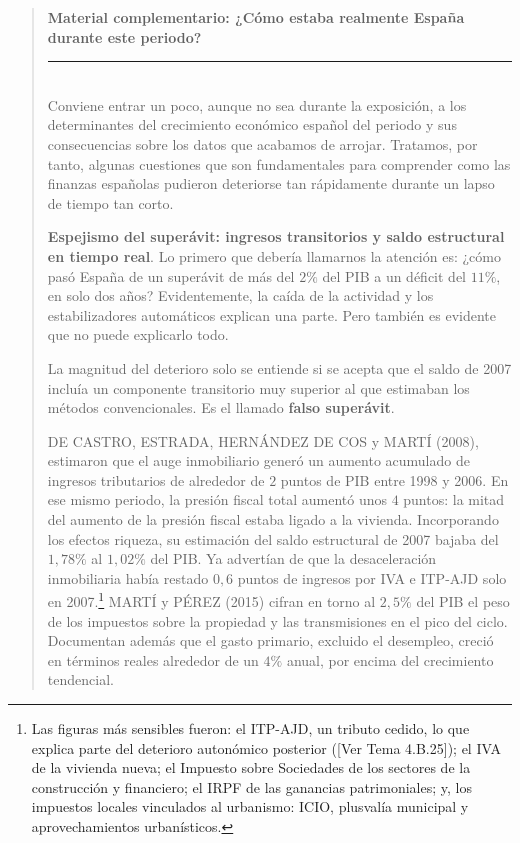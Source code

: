 \documentclass[10pt,a4paper]{article}
\newenvironment{specialblock}[1]{%
      \begin{quote} %
      \small %
      \noindent\textbf{#1}\\[-0.3em] %
      \rule{\linewidth}{0.4pt}\\[0.6em]}{
      \end{quote}}
\newcommand{\authorfont}[1]{{\fontfamily{EBGaramond-TLF}\selectfont #1}}
\begin{document}
\begin{specialblock}{\textbf{Material complementario:} ¿Cómo estaba \textbf{realmente} España durante este periodo?}
    Conviene entrar un poco, aunque no sea durante la exposición, a los determinantes del crecimiento económico español del periodo y sus consecuencias sobre los datos que acabamos de arrojar. Tratamos, por tanto, algunas cuestiones que son fundamentales para comprender como las finanzas españolas pudieron deteriorse tan rápidamente durante un lapso de tiempo tan corto.

    \textbf{Espejismo del superávit: ingresos transitorios y saldo estructural en tiempo real}. Lo primero que debería llamarnos la atención es: ¿cómo pasó España de un superávit de más del $2\%$ del PIB a un déficit del $11\%$, en solo dos años? Evidentemente, la caída de la actividad y los estabilizadores automáticos explican una parte. Pero también es evidente que no puede explicarlo todo.
    
    La magnitud del deterioro solo se entiende si se acepta que el saldo de 2007 incluía un componente transitorio muy superior al que estimaban los métodos convencionales. Es el llamado \textbf{falso superávit}.

    DE CASTRO, ESTRADA, HERNÁNDEZ DE COS y MARTÍ (2008), estimaron que el auge inmobiliario generó un aumento acumulado de ingresos tributarios de alrededor de $2$ puntos de PIB entre 1998 y 2006. En ese mismo periodo, la presión fiscal total aumentó unos $4$ puntos: la mitad del aumento de la presión fiscal estaba ligado a la vivienda. Incorporando los efectos riqueza, su estimación del saldo estructural de 2007 bajaba del $1,78\%$ al $1,02\%$ del PIB. Ya advertían de que la desaceleración inmobiliaria había restado $0,6$ puntos de ingresos por IVA e ITP-AJD solo en 2007.\footnote{Las figuras más sensibles fueron: el ITP-AJD, un tributo cedido, lo que explica parte del deterioro autonómico posterior ([\authorfont{Ver Tema 4.B.25}]); el IVA de la vivienda nueva; el Impuesto sobre Sociedades de los sectores de la construcción y financiero; el IRPF de las ganancias patrimoniales; y, los impuestos locales vinculados al urbanismo: ICIO, plusvalía municipal y aprovechamientos urbanísticos.
    } MARTÍ y PÉREZ (2015) cifran en torno al $2,5\%$ del PIB el peso de los impuestos sobre la propiedad y las transmisiones en el pico del ciclo. Documentan además que el gasto primario, excluido el desempleo, creció en términos reales alrededor de un $4\%$ anual, por encima del crecimiento tendencial.
    

\end{specialblock}
\end{document}
